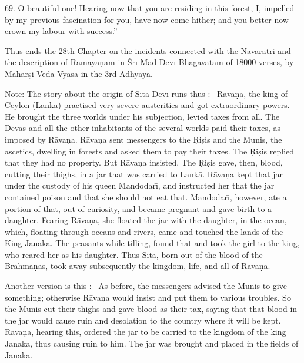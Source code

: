 69. O beautiful one! Hearing now that you are residing in this forest, I, impelled by my previous fascination for you, have now come hither; and you better now crown my labour with success.''

Thus ends the 28th Chapter on the incidents connected with the Navar\=atri and the description of R\=amaya\d{n}am in \'Sr\={\i} Mad Dev\={\i} Bh\=agavatam of 18000 verses, by Mahar\d{s}i Veda Vy\=asa in the 3rd Adhy\=aya.

Note: The story about the origin of S\={\i}t\=a Dev\={\i} runs thus :-- R\=ava\d{n}a, the king of Ceylon (Lank\=a) practised very severe austerities and got extraordinary powers. He brought the three worlds under his subjection, levied taxes from all. The Devas and all the other inhabitants of the several worlds paid their taxes, as imposed by R\=ava\d{n}a. R\=ava\d{n}a sent messengers to the \d{R}i\d{s}is and the Munis, the ascetics, dwelling in forests and asked them to pay their taxes. The \d{R}i\d{s}is replied that they had no property. But R\=ava\d{n}a insisted. The \d{R}i\d{s}is gave, then, blood, cutting their thighs, in a jar that was carried to Lank\=a. R\=ava\d{n}a kept that jar under the custody of his queen Mandodar\={\i}, and instructed her that the jar contained poison and that she should not eat that. Mandodar\={\i}, however, ate a portion of that, out of curiosity, and became pregnant and gave birth to a daughter. Fearing R\=ava\d{n}a, she floated the jar with the daughter, in the ocean, which, floating through oceans and rivers, came and touched the lands of the King Janaka. The peasants while tilling, found that and took the girl to the king, who reared her as his daughter. Thus S\={\i}t\=a, born out of the blood of the Br\=ahma\d{n}as, took away subsequently the kingdom, life, and all of R\=ava\d{n}a.

Another version is this :-- As before, the messengers advised the Munis to give something; otherwise R\=ava\d{n}a would insist and put them to various troubles. So the Munis cut their thighs and gave blood as their tax, saying that that blood in the jar would cause ruin and desolation to the country where it will be kept. R\=ava\d{n}a, hearing this, ordered the jar to be carried to the kingdom of the king Janaka, thus causing ruin to him. The jar was brought and placed in the fields of Janaka.

